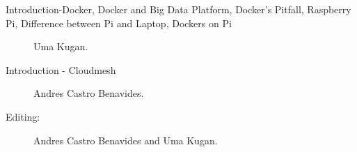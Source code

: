 	\begin{description}
		
		\item[Introduction-Docker, Docker and Big Data Platform, 
    Docker's Pitfall, Raspberry Pi, Difference between Pi and Laptop, Dockers on Pi] Uma Kugan.
		\item[Introduction - Cloudmesh] Andres Castro Benavides.
		
		\item[Editing:] Andres Castro Benavides and Uma Kugan.
		
	\end{description}
	

